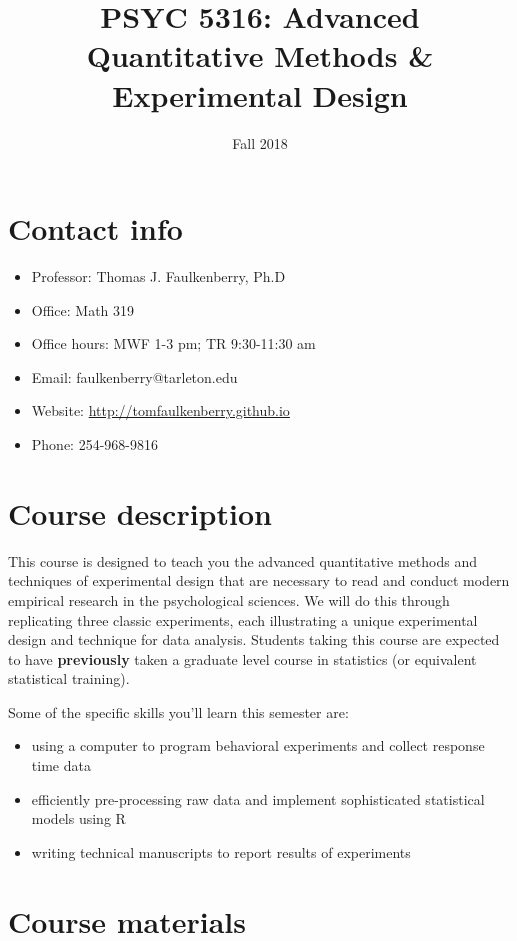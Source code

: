 \documentclass[10pt]{article}
\date{Fall 2018}
\title{PSYC 5316: Advanced Quantitative Methods \& Experimental Design}
\begin{document}
\maketitle

\section*{Contact info}
\label{sec-1}
\begin{itemize}
\item Professor: Thomas J. Faulkenberry, Ph.D
\item Office: Math 319
\item Office hours: MWF 1-3 pm; TR 9:30-11:30 am
\item Email: faulkenberry@tarleton.edu
\item Website: \url{http://tomfaulkenberry.github.io}
\item Phone: 254-968-9816
\end{itemize}

\section*{Course description}
\label{sec-2}

This course is designed to teach you the advanced quantitative methods and techniques of experimental design that are necessary to read and conduct modern empirical research in the psychological sciences. We will do this through replicating three classic experiments, each illustrating a unique experimental design and technique for data analysis.  Students taking this course are expected to have \textbf{previously} taken a graduate level course in statistics (or equivalent statistical training). 

Some of the specific skills you'll learn this semester are:
\begin{itemize}
\item using a computer to program behavioral experiments and collect response time data
\item efficiently pre-processing raw data and implement sophisticated statistical models using R
\item writing technical manuscripts to report results of experiments
\end{itemize}

\section*{Course materials}
\label{sec-3}
\end{document}
